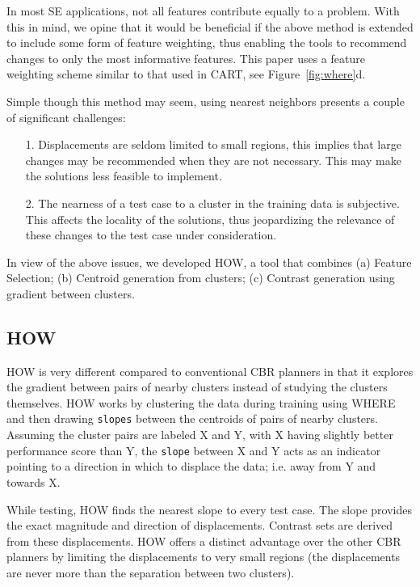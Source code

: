 \documentclass{sig-alternate}
\newcommand{\fig}[1]{Figure~\ref{fig:#1}}
\begin{document}
In most SE applications, not all features contribute equally to a problem. With this in mind, we opine that it would be beneficial if the above method is extended to include some form of feature weighting, thus enabling the tools to recommend changes to only the most informative features. This paper uses a feature weighting scheme similar to that used in CART, see \fig{where}d.

Simple though this method may seem, using nearest neighbors presents a couple of significant challenges: 
\begin{itemize}
\item[1.] Displacements are seldom limited to small regions, this implies that large changes may be recommended when they are not necessary. This may make the solutions less feasible to implement. 
\item[2.] The nearness of a test case to a cluster in the training data is subjective. This affects the locality of the solutions, thus jeopardizing the relevance of these changes to the test case under consideration.
\end{itemize}

In view of the above issues, we developed HOW, a tool that combines (a) Feature Selection; (b) Centroid generation from clusters; (c) Contrast generation using gradient between clusters.

\subsection{HOW}

HOW is very different compared to conventional CBR planners in that it explores the gradient between pairs of nearby clusters instead of studying the clusters themselves. HOW works by clustering the data during training using WHERE and then drawing \texttt{slopes} between the centroids of pairs of nearby clusters. Assuming the cluster pairs are labeled X and Y, with X having slightly better performance score than Y, the \texttt{slope} between X and Y acts as an indicator pointing to a direction in which to displace the data; i.e. away from Y and towards X. 

While testing, HOW finds the nearest slope to every test case. The slope provides the exact magnitude and direction of displacements. Contrast sets are derived from these displacements. HOW offers a distinct advantage over the other CBR planners by limiting the displacements to very small regions (the displacements are never more than the separation between two clusters). 
\end{document}
